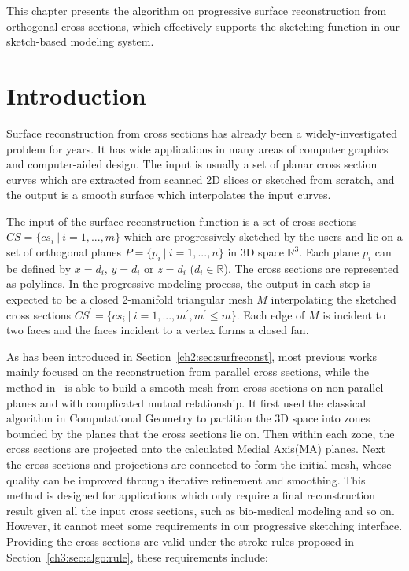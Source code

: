 This chapter presents the algorithm on progressive surface
reconstruction from orthogonal cross sections, which effectively
supports the sketching function in our sketch-based modeling system.

\section{Introduction}
\label{ch4:sec:intro}

Surface reconstruction from cross sections has already been a
widely-investigated problem for years. It has wide applications in
many areas of computer graphics and computer-aided design. The input
is usually a set of planar cross section curves which are extracted
from scanned 2D slices or sketched from scratch, and the output is a
smooth surface which interpolates the input curves.

The input of the surface reconstruction function is a set of cross
sections $CS=\{cs_i~|~i=1,...,m\}$ which are progressively sketched
by the users and lie on a set of orthogonal planes
$P=\{p_i~|~i=1,...,n\}$ in 3D space $\mathbb{R}^3$. Each plane $p_i$
can be defined by $x=d_i$, $y=d_i$ or $z=d_i$ ($d_i\in \mathbb{R}$).
The cross sections are represented as polylines. In the progressive
modeling process, the output in each step is expected to be a closed
2-manifold triangular mesh $M$ interpolating the sketched cross
sections $CS^\prime=\{cs_i~|~i=1,...,m^\prime, m^\prime\leq m\}$.
Each edge of $M$ is incident to two faces and the faces incident to
a vertex forms a closed fan.

As has been introduced in Section~\ref{ch2:sec:surfreconst}, most previous
works mainly focused on the reconstruction from parallel cross
sections, while the method in~\cite{LBDLJ08} is able to build a
smooth mesh from cross sections on non-parallel planes and with
complicated mutual relationship. It first used the classical
algorithm in Computational Geometry to partition the 3D space into
zones bounded by the planes that the cross sections lie on. Then
within each zone, the cross sections are projected onto the
calculated Medial Axis(MA) planes. Next the cross sections and
projections are connected to form the initial mesh, whose quality
can be improved through iterative refinement and smoothing. This
method is designed for applications which only require a final
reconstruction result given all the input cross sections, such as
bio-medical modeling and so on. However, it cannot meet some
requirements in our progressive sketching interface. Providing the
cross sections are valid under the stroke rules proposed in
Section~\ref{ch3:sec:algo:rule}, these requirements include:

